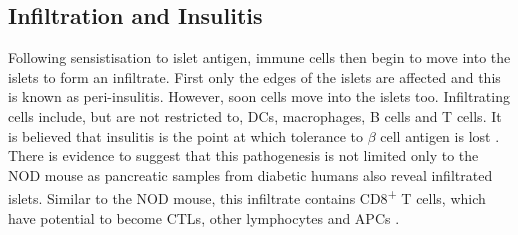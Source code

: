





\subsection{Infiltration and Insulitis}

Following sensistisation to islet antigen, immune cells then begin to move into the islets to form an infiltrate.
First only the edges of the islets are affected and this is known as peri-insulitis\citep{Thomas2000}.
However, soon cells move into the islets too.
Infiltrating cells include, but are not restricted to, DCs, macrophages, B cells and T cells\citep{Brodie2008}.
It is believed that insulitis is the point at which tolerance to $\beta$ cell antigen is lost \citep{Thomas2000}.
There is evidence to suggest that this pathogenesis is not limited only to the NOD mouse as pancreatic samples from diabetic humans also reveal infiltrated islets.
Similar to the NOD mouse, this infiltrate contains CD8\textsuperscript{+} T cells, which have potential to become CTLs, other lymphocytes and APCs \citep{Hanafusa2008}.

